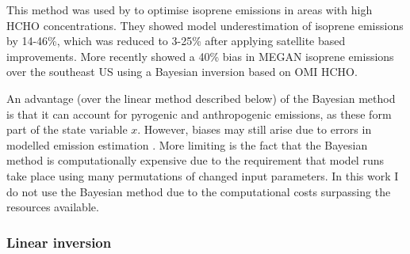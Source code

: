       This method was used by \textcite{Shim2005} to optimise isoprene emissions in areas with high HCHO concentrations. 
      They showed model underestimation of isoprene emissions by 14-46\%, which was reduced to 3-25\% after applying satellite based improvements.
      More recently \textcite{Kaiser2018} showed a 40\% bias in MEGAN isoprene emissions over the southeast US using a Bayesian inversion based on OMI HCHO.
      
      An advantage (over the linear method described below) of the Bayesian method is that it can account for pyrogenic and anthropogenic emissions, as these form part of the state variable $x$.
      However, biases may still arise due to errors in modelled emission estimation \parencite{Curci2010}.
      More limiting is the fact that the Bayesian method is computationally expensive due to the requirement that model runs take place using many permutations of changed input parameters.
      In this work I do not use the Bayesian method due to the computational costs surpassing the resources available.
      
    \subsubsection{Linear inversion}
      \label{BioIsop:intro:top_down_linear}
      
